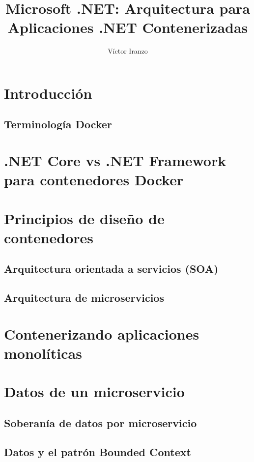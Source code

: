 \documentclass[11pt,a4paper]{article}
\author{Víctor Iranzo}
\title{Microsoft .NET: Arquitectura para Aplicaciones .NET Contenerizadas}
\begin{document}
\maketitle

\section{Introducción}

\subsection{Terminología Docker}

\section{.NET Core vs .NET Framework para contenedores Docker}

\section{Principios de diseño de contenedores}

\subsection{Arquitectura orientada a servicios (SOA)}

\subsection{Arquitectura de microservicios}

\section{Contenerizando aplicaciones monolíticas}

\section{Datos de un microservicio}

\subsection{Soberanía de datos por microservicio}

\subsection{Datos y el patrón Bounded Context}
\end{document}
